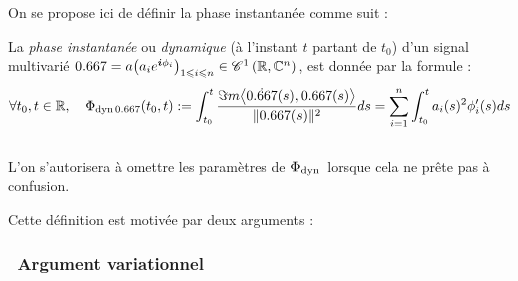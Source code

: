 On se propose ici de définir la phase instantanée comme suit :
\begin{definition} \label{def:phase_d}
	La \emph{phase instantanée} ou \emph{dynamique} (à l'instant $t$ partant de $t_0$) d'un signal multivarié $\x = a\big(a_ie^{\i \phi_i}\big)_{1\leq i\leq n} \in \conti[1]{\R}{\C^n}$, est donnée par la formule :
	\begin{equation} \label{eq:phase_d}
		\forall t_0, t\in\R, \quad \phased[\x](t_0,t) \defeq \int_{t_0}^t \frac{\Im m \big\langle \dot{\x}(s) , \x(s) \big\rangle}{\|\x(s)\|^2} ds =\sum_{i=1}^n \int_{t_0}^t a_i(s)^2 \phi_i'(s)ds
	\end{equation}
	\\
	L'on s'autorisera à omettre les paramètres de $\Phi_{\text{\normalfont dyn}\, }$ lorsque cela ne prête pas à confusion.
\end{definition}
\skipl

Cette définition est motivée par deux arguments :



\subsubsection*{\textbullet\ Argument variationnel}


